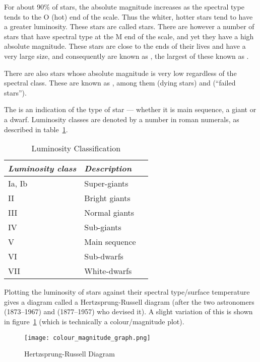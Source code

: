 For about 90\% of stars, the absolute magnitude increases as the
spectral type tends to the O (hot) end of the scale. Thus the whiter,
hotter stars tend to have a greater luminosity. These stars are called
 stars. There are however a number of stars that
have spectral type at the M end of the scale, and yet they have a high
absolute magnitude. These stars are close to the ends of their lives
and have a very large size, and consequently are known as
, the largest of these known as .

There are also stars whose absolute magnitude is very low regardless
of the spectral class. These are known as , among
them  (dying stars) and 
(``failed stars'').

The  is an indication of the type of star ---
whether it is main sequence, a giant or a dwarf. Luminosity classes are
denoted by a number in roman numerals, as described in table~\ref{tab:luminosityclass}.

\begin{table}[tb]
  \centering\small
  \begin{tabular}{lll}
\toprule
\emph{Luminosity class} & \emph{Description}\\\midrule
Ia, Ib & Super-giants\\
II     & Bright giants\\
III    & Normal giants\\
IV     & Sub-giants\\
V      & Main sequence\\
VI     & Sub-dwarfs\\
VII    & White-dwarfs\\
\bottomrule
\end{tabular}
\caption{Luminosity Classification}
\label{tab:luminosityclass}
\end{table}

Plotting the luminosity of stars against their spectral type/surface
temperature gives a diagram called a Hertzsprung-Russell diagram
(after the two astronomers  (1873--1967) and 
 (1877--1957) who devised it). A slight variation of this is shown
in figure~\ref{fig:colourmag} (which is technically a colour/magnitude
plot).

\begin{figure}[tp]
\centering\texttt{[image: colour\_magnitude\_graph.png]}
\caption{Hertzsprung-Russell Diagram}
\label{fig:colourmag}
\end{figure}

